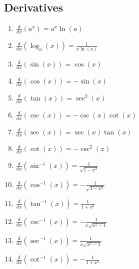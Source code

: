 \documentclass{article}[11pt]
\theoremstyle{definition}
\numberwithin{equation}{section}
\begin{document}
\subsection{Derivatives}
\begin{multicols}{2}
	\begin{enumerate}
		\item \( \displaystyle \frac{d}{dx} \left( a^x \right) = a^x\ln(a) \)
		\item \( \displaystyle \frac{d}{dx} \left(  \log_a(x) \right) =  \frac{1}{x\ln(a)}\)
		\item \( \displaystyle \frac{d}{dx} \left( \sin(x) \right) = \cos(x) \)
		\item \( \displaystyle \frac{d}{dx} \left( \cos(x) \right) = -\sin(x) \)
		\item \( \displaystyle \frac{d}{dx} \left( \tan(x) \right) = \sec^2(x) \)
		\item \( \displaystyle \frac{d}{dx} \left( \csc(x) \right) = -\csc(x)\cot(x) \)
		\item \( \displaystyle \frac{d}{dx} \left( \sec(x) \right) = \sec(x)\tan(x) \)
		\item \( \displaystyle \frac{d}{dx} \left( \cot(x) \right) = -\csc^2(x) \)
		\item \( \displaystyle \frac{d}{dx} \left( \sin^{-1}(x) \right) = \frac{1}{\sqrt{1-x^2}} \)
		\item \( \displaystyle \frac{d}{dx} \left( \cos^{-1}(x) \right) = -\frac{1}{\sqrt{1-x^2}} \)
		\item \( \displaystyle \frac{d}{dx} \left( \tan^{-1}(x) \right) = \frac{1}{1+x^2} \)
		\item \( \displaystyle \frac{d}{dx} \left( \csc^{-1}(x) \right) = -\frac{1}{x\sqrt{x^2-1}} \)
		\item \( \displaystyle \frac{d}{dx} \left( \sec^{-1}(x) \right) = \frac{1}{x\sqrt{x^2-1}} \)
		\item \( \displaystyle \frac{d}{dx} \left( \cot^{-1}(x) \right) = -\frac{1}{1+x^2} \)
	\end{enumerate}
\end{multicols}
\end{document}
